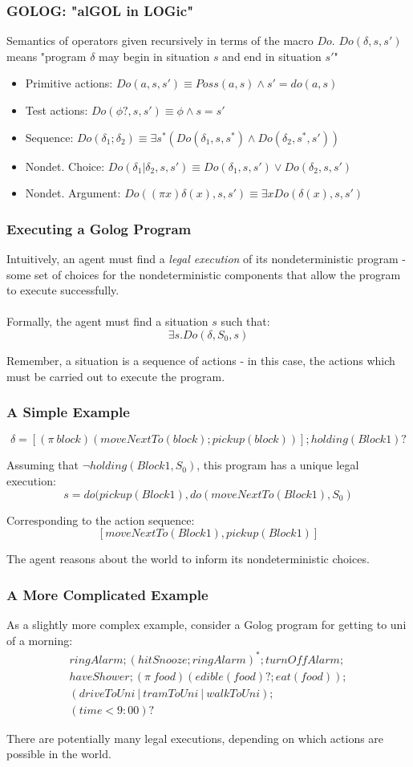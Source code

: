 \documentclass{beamer}
\begin{document}
\begin{frame}
\frametitle{GOLOG: "alGOL in LOGic"}
Semantics of operators given recursively in terms of the macro $Do$.
$Do(\delta,s,s')$ means "program $\delta$ may begin in situation $s$ and end
in situation $s'$"
\begin{itemize}
  \item Primitive actions: $Do(a,s,s') \equiv Poss(a,s)\wedge s'=do(a,s)$
  \item Test actions: $Do(\phi?,s,s') \equiv \phi \wedge s=s'$
  \item Sequence: $Do(\delta_1;\delta_2) \equiv \exists s^* (Do(\delta_1,s,s^*)\wedge Do(\delta_2,s^*,s'))$
  \item Nondet. Choice: $Do(\delta_1|\delta_2,s,s') \equiv Do(\delta_1,s,s')\vee Do(\delta_2,s,s')$
  \item Nondet. Argument: $Do((\pi x)\delta(x),s,s') \equiv \exists x Do(\delta(x),s,s')$
\end{itemize}
\end{frame}

\begin{frame}
\frametitle{Executing a Golog Program}
Intuitively, an agent must find a \emph{legal execution} of its nondeterministic
program - some set of choices for the nondeterministic components that allow
the program to execute successfully.\\
\ \\
Formally, the agent must find a situation $s$ such that:\[
\exists s . Do(\delta,S_0,s)\]


Remember, a situation is a sequence of actions - in this case, the actions which must be carried out to execute the program.
\end{frame}

\begin{frame}
\frametitle{A Simple Example}
\[\delta = [(\pi\ block)(moveNextTo(block);pickup(block))];holding(Block1)?\]

Assuming that $\neg holding(Block1,S_0)$, this program has a unique
legal execution:\[
s = do(pickup(Block1),do(moveNextTo(Block1),S_0)\]

Corresponding to the action sequence:\[
[moveNextTo(Block1), pickup(Block1)]\]

The agent reasons about the world to inform its nondeterministic choices.
\end{frame}

\begin{frame}
\frametitle{A More Complicated Example}
As a slightly more complex example, consider a Golog program for
getting to uni of a morning:\[
\begin{array}{c}
ringAlarm;(hitSnooze; ringAlarm)^*;turnOffAlarm;\\
haveShower;(\pi\ food)(edible(food)?;eat(food));\\
(driveToUni\ |\ tramToUni\ |\ walkToUni);\\
(time<9:00)?
\end{array}\]

There are potentially many legal executions, depending on which actions
are possible in the world.
\end{frame}
\end{document}
